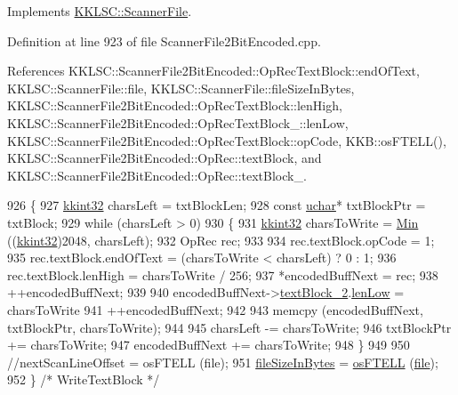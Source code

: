 Implements \hyperlink{class_k_k_l_s_c_1_1_scanner_file_ade81ae552ed646a84a334c49163b9a12}{K\+K\+L\+S\+C\+::\+Scanner\+File}.



Definition at line 923 of file Scanner\+File2\+Bit\+Encoded.\+cpp.



References K\+K\+L\+S\+C\+::\+Scanner\+File2\+Bit\+Encoded\+::\+Op\+Rec\+Text\+Block\+::end\+Of\+Text, K\+K\+L\+S\+C\+::\+Scanner\+File\+::file, K\+K\+L\+S\+C\+::\+Scanner\+File\+::file\+Size\+In\+Bytes, K\+K\+L\+S\+C\+::\+Scanner\+File2\+Bit\+Encoded\+::\+Op\+Rec\+Text\+Block\+::len\+High, K\+K\+L\+S\+C\+::\+Scanner\+File2\+Bit\+Encoded\+::\+Op\+Rec\+Text\+Block\+\_\+::len\+Low, K\+K\+L\+S\+C\+::\+Scanner\+File2\+Bit\+Encoded\+::\+Op\+Rec\+Text\+Block\+::op\+Code, K\+K\+B\+::os\+F\+T\+E\+L\+L(), K\+K\+L\+S\+C\+::\+Scanner\+File2\+Bit\+Encoded\+::\+Op\+Rec\+::text\+Block, and K\+K\+L\+S\+C\+::\+Scanner\+File2\+Bit\+Encoded\+::\+Op\+Rec\+::text\+Block\+\_.


\begin{DoxyCode}
926 \{
927   \hyperlink{namespace_k_k_b_a8fa4952cc84fda1de4bec1fbdd8d5b1b}{kkint32}  charsLeft = txtBlockLen;
928   \textcolor{keyword}{const} \hyperlink{namespace_k_k_b_ace9969169bf514f9ee6185186949cdf7}{uchar}*  txtBlockPtr = txtBlock;
929   \textcolor{keywordflow}{while}  (charsLeft > 0)
930   \{
931     \hyperlink{namespace_k_k_b_a8fa4952cc84fda1de4bec1fbdd8d5b1b}{kkint32}  charsToWrite = \hyperlink{_raster_8cpp_a6261a282d8ed27242c636ad5fb658585}{Min} ((\hyperlink{namespace_k_k_b_a8fa4952cc84fda1de4bec1fbdd8d5b1b}{kkint32})2048, charsLeft);
932     OpRec  rec;
933 
934     rec.textBlock.opCode     = 1;
935     rec.textBlock.endOfText  = (charsToWrite < charsLeft) ? 0 : 1;
936     rec.textBlock.lenHigh    = charsToWrite / 256;
937     *encodedBuffNext = rec;
938     ++encodedBuffNext;
939 
940     encodedBuffNext->\hyperlink{union_scanner_file2_bit_encoded_1_1_op_rec_a248430767d96c07d738f9b7209b324e4}{textBlock\_2}.\hyperlink{struct_scanner_file2_bit_encoded_1_1_op_rec_text_block__2_abedb614c6b2b8ad2ff3e2ace167fe96e}{lenLow} = charsToWrite %
941     ++encodedBuffNext;
942 
943     memcpy (encodedBuffNext, txtBlockPtr, charsToWrite);
944 
945     charsLeft       -= charsToWrite;
946     txtBlockPtr     += charsToWrite;
947     encodedBuffNext += charsToWrite;
948   \}
949 
950   \textcolor{comment}{//nextScanLineOffset = osFTELL (file);}
951   \hyperlink{class_k_k_l_s_c_1_1_scanner_file_aa630f7e950cfd1cd6ecaa901f410728a}{fileSizeInBytes} = \hyperlink{namespace_k_k_b_a2cc11a5ae09d10d69ad751b549e5d94e}{osFTELL} (\hyperlink{class_k_k_l_s_c_1_1_scanner_file_a26db15f7823ce67b1621da17468ec807}{file});
952 \}  \textcolor{comment}{/* WriteTextBlock */}
\end{DoxyCode}


